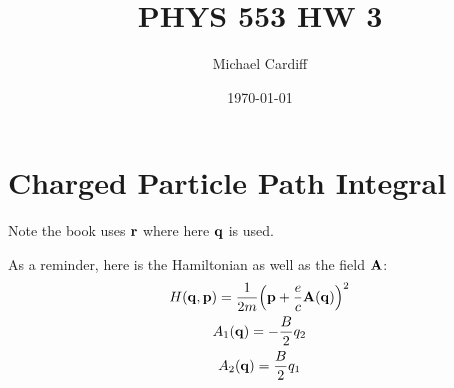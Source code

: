 \documentclass[12pt]{article}
\title{\vspace{-3em}PHYS 553 HW 3}
\author{Michael Cardiff}
\date{\today}
\newcommand{\q}{\vb{q}}
\newcommand{\p}{\vb{p}}
\begin{document}
\maketitle

\section{Charged Particle Path Integral}
Note the book uses $\vb{r}$ where here $\q$ is used.

As a reminder, here is the Hamiltonian as well as the field $\vb{A}$:
\begin{gather*}
  H(\q,\p)=\frac{1}{2m}\qty(\p+\frac{e}{c}\vb{A}(\q))^2\\
  A_1(\q)=-\frac{B}{2}q_2\\ A_2(\q)=\frac{B}{2}q_1
\end{gather*}
\end{document}

